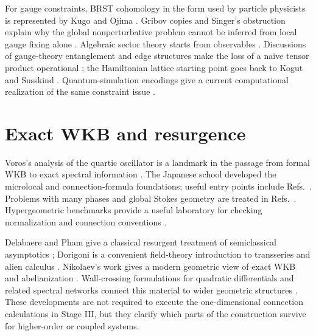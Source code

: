 For gauge constraints, BRST cohomology in the form used by particle
physicists is represented by Kugo and Ojima \cite{KugoOjima:1979}.  Gribov
copies and Singer's obstruction explain why the global nonperturbative
problem cannot be inferred from local gauge fixing alone
\cite{Gribov:1978,Singer:1978}.  Algebraic sector theory starts from
observables \cite{DoplicherHaagRoberts:1971,BuchholzFredenhagen:1982}.
Discussions of gauge-theory entanglement and edge structures make the loss of
a naive tensor product operational
\cite{CasiniHuertaRosabal:2014,DonnellyFreidel:2016,FewsterSplit:2015}; the
Hamiltonian lattice starting point goes back to Kogut and Susskind
\cite{KogutSusskind:1975}.  Quantum-simulation encodings give a current
computational realization of the same constraint issue \cite{PardoEtAl:2023}.

\section*{Exact WKB and resurgence}

Voros's analysis of the quartic oscillator is a landmark in the passage from
formal WKB to exact spectral information \cite{Voros:1983xx}.  The Japanese
school developed the microlocal and connection-formula foundations; useful
entry points include Refs.~\cite{AokiKawaiTakei1991RIMS853,Kawai:2005,
AokiIwakiTakahashi2019LoopType,AokiYoshida1993MicrolocalReduction}.  Problems
with many phases and global Stokes geometry are treated in
Refs.~\cite{AokiKawaiKoikeTakei2003GlobalAspects,
AokiKawaiKoikeTakei2004InfinitelyManyPhases,
AokiKawaiKoikeTakei2004MicroWKB}.  Hypergeometric benchmarks provide a useful
laboratory for checking normalization and connection conventions
\cite{AOKI:2021hmu}.

Delabaere and Pham give a classical resurgent treatment of semiclassical
asymptotics \cite{Delabaere:1999xx}; Dorigoni is a convenient field-theory
introduction to transseries and alien calculus \cite{Dorigoni:2014hea}.
Nikolaev's work gives a modern geometric view of exact WKB and
abelianization \cite{Nikolaev:2019img,Nikolaev:2021xzt,Nikolaev:2024}.
Wall-crossing formulations for quadratic differentials and related spectral
networks connect this material to wider geometric structures
\cite{Allegretti:2020dyt,Grassi:2022zuk}.  These developments are not required
to execute the one-dimensional connection calculations in Stage III, but
they clarify which parts of the construction survive for higher-order or
coupled systems.

